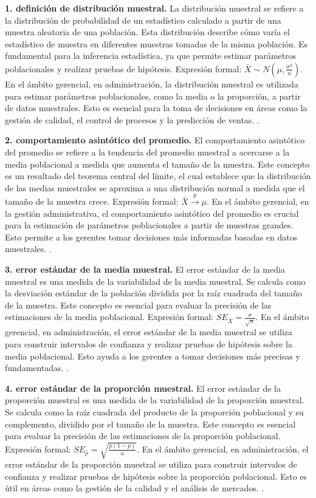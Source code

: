 {\textbf{1. definición de distribución muestral.} La distribución muestral se refiere a la distribución de probabilidad de un estadístico calculado a partir de una muestra aleatoria de una población. Esta distribución describe cómo varía el estadístico de muestra en diferentes muestras tomadas de la misma población. Es fundamental para la inferencia estadística, ya que permite estimar parámetros poblacionales y realizar pruebas de hipótesis. Expresión formal: $\bar{X} \sim N(\mu, \frac{\sigma^2}{n})$. En el ámbito gerencial, en administración, la distribución muestral es utilizada para estimar parámetros poblacionales, como la media o la proporción, a partir de datos muestrales. Esto es esencial para la toma de decisiones en áreas como la gestión de calidad, el control de procesos y la predicción de ventas. \citep{anderson2012,lind2012,wackerly2010}.

\textbf{2. comportamiento asintótico del promedio.} El comportamiento asintótico del promedio se refiere a la tendencia del promedio muestral a acercarse a la media poblacional a medida que aumenta el tamaño de la muestra. Este concepto es un resultado del teorema central del límite, el cual establece que la distribución de las medias muestrales se aproxima a una distribución normal a medida que el tamaño de la muestra crece. Expresión formal: $\bar{X} \xrightarrow{p} \mu$. En el ámbito gerencial, en la gestión administrativa, el comportamiento asintótico del promedio es crucial para la estimación de parámetros poblacionales a partir de muestras grandes. Esto permite a los gerentes tomar decisiones más informadas basadas en datos muestrales. \citep{anderson2012,lind2012,wackerly2010}.

\textbf{3. error estándar de la media muestral.} El error estándar de la media muestral es una medida de la variabilidad de la media muestral. Se calcula como la desviación estándar de la población dividida por la raíz cuadrada del tamaño de la muestra. Este concepto es esencial para evaluar la precisión de las estimaciones de la media poblacional. Expresión formal: $SE_{\bar{X}} = \frac{\sigma}{\sqrt{n}}$. En el ámbito gerencial, en administración, el error estándar de la media muestral se utiliza para construir intervalos de confianza y realizar pruebas de hipótesis sobre la media poblacional. Esto ayuda a los gerentes a tomar decisiones más precisas y fundamentadas. \citep{anderson2012,lind2012,wackerly2010}.

\textbf{4. error estándar de la proporción muestral.} El error estándar de la proporción muestral es una medida de la variabilidad de la proporción muestral. Se calcula como la raíz cuadrada del producto de la proporción poblacional y su complemento, dividido por el tamaño de la muestra. Este concepto es esencial para evaluar la precisión de las estimaciones de la proporción poblacional. Expresión formal: $SE_{\hat{p}} = \sqrt{\frac{p(1-p)}{n}}$. En el ámbito gerencial, en administración, el error estándar de la proporción muestral se utiliza para construir intervalos de confianza y realizar pruebas de hipótesis sobre la proporción poblacional. Esto es útil en áreas como la gestión de la calidad y el análisis de mercados. \citep{anderson2012,lind2012,wackerly2010}.

}
